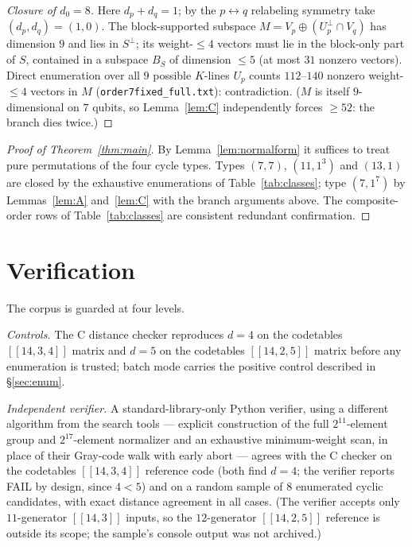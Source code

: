 \documentclass[11pt]{amsart}
\newcommand{\code}[3]{[[#1,#2,#3]]}
\newcommand{\Sperp}{S^{\perp}}
\theoremstyle{plain}
\theoremstyle{definition}
\theoremstyle{remark}
\begin{document}
\begin{proof}[Closure of $d_{0}=8$]
Here $d_{p}+d_{q}=1$; by the $p\leftrightarrow q$ relabeling symmetry
take $(d_{p},d_{q})=(1,0)$. The block-supported subspace
$M=V_{p}\oplus(U_{p}^{\perp}\cap V_{q})$ has dimension $9$ and lies in
$\Sperp$; its weight-$\le4$ vectors must lie in the block-only part of
$S$, contained in a subspace $B_{S}$ of dimension $\le5$ (at most $31$
nonzero vectors). Direct enumeration over all $9$ possible $K$-lines
$U_{p}$ counts $112$--$140$ nonzero weight-$\le4$ vectors in $M$
(\texttt{order7fixed\_full.txt}): contradiction. ($M$ is itself
$9$-dimensional on $7$ qubits, so Lemma~\ref{lem:C} independently forces
$\ge52$: the branch dies twice.)
\end{proof}

\begin{proof}[Proof of Theorem~\ref{thm:main}]
By Lemma~\ref{lem:normalform} it suffices to treat pure permutations of
the four cycle types. Types $(7,7)$, $(11,1^{3})$ and $(13,1)$ are closed
by the exhaustive enumerations of Table~\ref{tab:classes}; type
$(7,1^{7})$ by Lemmas~\ref{lem:A} and~\ref{lem:C} with the branch
arguments above. The composite-order rows of Table~\ref{tab:classes} are
consistent redundant confirmation.
\end{proof}

\section{Verification}\label{sec:verify}

The corpus is guarded at four levels.

\emph{Controls.} The C distance checker reproduces $d=4$ on the
codetables $\code{14}{3}{4}$ matrix and $d=5$ on the codetables
$\code{14}{2}{5}$ matrix before any enumeration is trusted; batch mode
carries the positive control described in \S\ref{sec:enum}.

\emph{Independent verifier.} A standard-library-only Python verifier,
using a different algorithm from the search tools --- explicit
construction of the full $2^{11}$-element group and $2^{17}$-element
normalizer and an exhaustive minimum-weight scan, in place of their
Gray-code walk with early abort --- agrees with the C checker on the
codetables $\code{14}{3}{4}$ reference code (both find $d=4$; the
verifier reports FAIL by design, since $4<5$) and on a random sample of
$8$ enumerated cyclic candidates, with exact distance agreement in all
cases. (The verifier accepts only $11$-generator $[[14,3]]$ inputs, so
the $12$-generator $\code{14}{2}{5}$ reference is outside its scope; the
sample's console output was not archived.)
\end{document}
